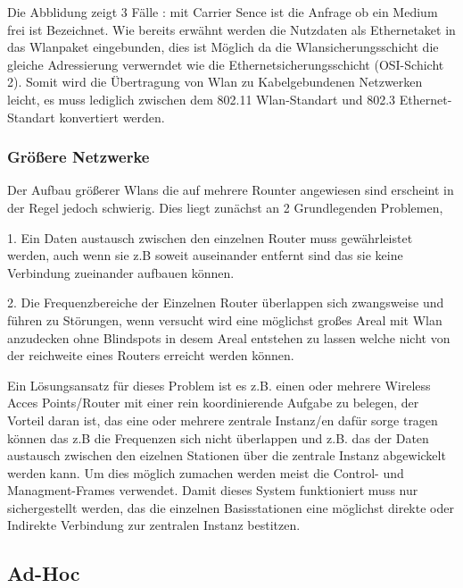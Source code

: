 \documentclass[a4paper,13pt]{scrartcl}
\begin{document}
Die Abblidung zeigt 3 Fälle : mit Carrier Sence ist die Anfrage ob ein Medium frei ist
Bezeichnet.
Wie bereits erwähnt werden die Nutzdaten als Ethernetaket in das Wlanpaket eingebunden, dies ist Möglich da die Wlansicherungsschicht die gleiche Adressierung verwerndet wie die Ethernetsicherungsschicht (OSI-Schicht 2). Somit wird die Übertragung von Wlan zu Kabelgebundenen Netzwerken leicht, es muss lediglich zwischen dem 802.11 Wlan-Standart und 802.3 Ethernet-Standart konvertiert werden.
\subsubsection{Größere Netzwerke}
Der Aufbau größerer Wlans die auf mehrere Rounter angewiesen sind erscheint in der Regel jedoch schwierig. Dies liegt zunächst an 2 Grundlegenden Problemen, 

1. Ein Daten austausch zwischen den einzelnen Router muss gewährleistet werden, auch wenn sie z.B soweit auseinander entfernt sind das sie keine Verbindung zueinander aufbauen können.

2. Die Frequenzbereiche der Einzelnen Router überlappen sich zwangsweise und führen zu Störungen, wenn versucht wird eine möglichst großes Areal mit Wlan anzudecken ohne Blindspots in desem Areal entstehen zu lassen welche nicht von der reichweite eines Routers erreicht werden können.

Ein Lösungsansatz für dieses Problem ist es z.B. einen oder mehrere Wireless Acces Points/Router mit einer rein koordinierende Aufgabe zu belegen, der Vorteil daran ist, das eine oder mehrere zentrale Instanz/en dafür sorge tragen können das z.B die Frequenzen sich nicht überlappen und z.B. das der Daten austausch zwischen den eizelnen Stationen über die zentrale Instanz abgewickelt werden kann. Um dies möglich zumachen werden meist die Control- und Managment-Frames verwendet. Damit dieses System funktioniert muss nur sichergestellt werden, das die einzelnen Basisstationen eine möglichst direkte oder Indirekte Verbindung zur zentralen Instanz bestitzen.


\subsection{Ad-Hoc}
\end{document}
